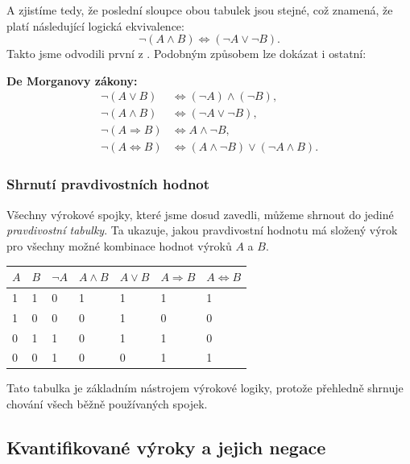 \documentclass[12pt,a4paper]{article}
\begin{document}
A zjistíme tedy, že poslední sloupce obou tabulek jsou stejné, což znamená, že platí následující logická ekvivalence:
\[
\neg(A \land B) \Leftrightarrow (\neg A \lor \neg B).
\]
Takto jsme odvodili první z .  
Podobným způsobem lze dokázat i ostatní:
\begin{notebox}
\textbf{De Morganovy zákony:}
\begin{align*}
\neg(A \lor B) &\Leftrightarrow (\neg A) \land (\neg B), \\
\neg(A \land B) &\Leftrightarrow (\neg A \lor \neg B), \\
\neg(A \Rightarrow B) &\Leftrightarrow A \land \neg B, \\
\neg(A \Leftrightarrow B) &\Leftrightarrow (A \land \neg B) \lor (\neg A \land B).
\end{align*}
\end{notebox}


\subsubsection*{Shrnutí pravdivostních hodnot}

Všechny výrokové spojky, které jsme dosud zavedli, můžeme shrnout do jediné \emph{pravdivostní tabulky}.  
Ta ukazuje, jakou pravdivostní hodnotu má složený výrok pro všechny možné kombinace hodnot výroků $A$ a $B$.

\begin{center}
\renewcommand{\arraystretch}{1.2}
\begin{tabular}{|C{1cm}|C{1cm}|C{1.5cm}|C{1.5cm}|C{1.5cm}|C{1.5cm}|C{1.5cm}|}
\hline
$A$ & $B$ & $\neg A$ & $A \land B$ & $A \lor B$ & $A \Rightarrow B$ & $A \Leftrightarrow B$ \\
 & 1 & 0 & 1 & 1 & 1 & 1 \\
1 & 0 & 0 & 0 & 1 & 0 & 0 \\
0 & 1 & 1 & 0 & 1 & 1 & 0 \\
0 & 0 & 1 & 0 & 0 & 1 & 1 \\
\hline
\end{tabular}
\end{center}

Tato tabulka je základním nástrojem výrokové logiky, protože přehledně shrnuje chování všech běžně používaných spojek.
\subsection{Kvantifikované výroky a jejich negace}
\end{document}
